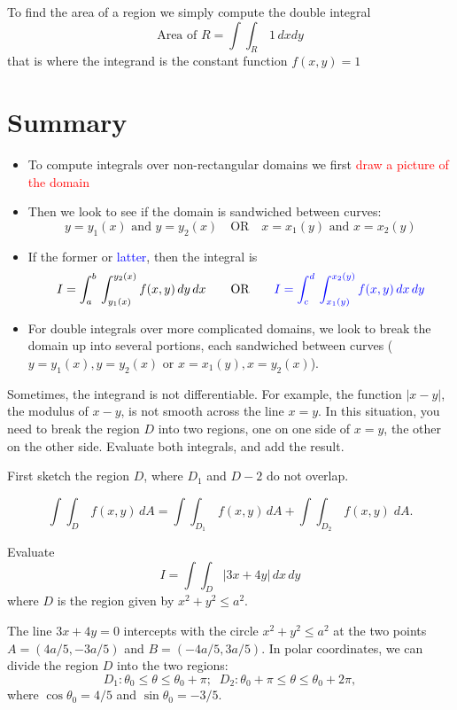 \documentclass{article}
\begin{document}
To find the area of a region we simply compute the double integral
$$
\mbox{Area of  } R = \int \int_R \, 1 \, dx dy
$$
that is where the integrand is the constant function $f(x,y) = 1$


\section*{Summary}

\begin{itemize}
\item
To compute integrals over non-rectangular domains we first \textcolor{red}{draw a picture of the domain}
\item
Then we look to see if the domain is sandwiched between curves:
$$
y = y_1 (x) \mbox{ and } y = y_2 (x) \quad \mbox{OR} \quad x = x_1 (y) \mbox{ and } x = x_2 (y)
$$
\item
If the former or \textcolor{blue}{latter}, then the integral is
$$ 
I= \int_a^b \, \int_{y_1(x)}^{y_2(x)} f(x,y) \, dy \, dx \qquad \mbox{OR} \qquad  \textcolor{blue}{I= \int_c^d \, \int_{x_1(y)}^{x_2(y)} f(x,y) \, dx \, dy}
$$
\item
For double integrals over more complicated domains, we look to break the domain up into several portions, each sandwiched between curves ($y=y_1 (x), y=y_2(x)$ or $x = x_1(y), x=y_2 (x)$).
\end{itemize} 



\bigskip

Sometimes, the integrand is not differentiable. For example, the
function $\vert x-y \vert$, the modulus of $x-y$, is not smooth
across the line $x=y$. In this situation, you need to break the
region $D$ into two regions, one on one side of $x=y$, the other
on the other side. Evaluate both integrals, and add the result.

First sketch the region $D$, where $D_1$ and $D-2$ do not overlap.

\vskip 5cm
%
$$
\int \int_D \, f(x,y) \, dA = \int \int_{D_1} \, f(x,y)\, dA +
\int \int_{D_2} \, f(x,y) \; dA .
$$


\bigskip

 Evaluate
$$
I = \int \int_D | 3x+4y| \, dx \, dy
$$
where $D$ is the region given by $ x^2+y^2 \le a^2$.

\vskip 5cm


The line $3x+4y=0 $ intercepts with the circle  $ x^2+y^2 \le a^2$
at the two points $A=(4 a/5, -3a/5)$ and $B=(-4 a/5, 3a/5)$. In
polar coordinates, we can divide the region $D$ into the two
regions:
$$
D_1: \theta_0 \le \theta \le  \theta_0+ \pi; \;\; D_2: \theta_0
+\pi \le \theta \le  \theta_0+ 2\pi,
$$
where $\cos \theta_0= 4/5$ and $\sin \theta_0=-3/5$.
\end{document}
